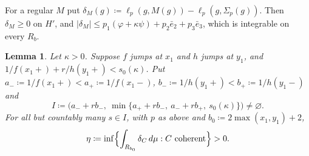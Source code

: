 \documentclass[11pt]{article}
\newtheorem{lemma}[theorem]{Lemma}
\theoremstyle{definition}\newtheorem{definition}[theorem]{Definition}
\theoremstyle{remark}\newtheorem{remark}[theorem]{Remark}
\begin{document}
For a regular $M$ put $\delta_M(g)\coloneqq\ell_p(g,M(g))-\ell_p(g,\Sigma_p(g))$.
Then $\delta_M\ge0$ on $H'$, and $|\delta_M|\le p_1(\varphi+\kappa\psi)+p_2\bar e_2
+p_3\bar e_3$, which is integrable on every $R_b$.

\begin{lemma}\label{lem:corner}
Let $\kappa>0$. Suppose $f$ jumps at $x_1$ and $h$ jumps at $y_1$, and
$1/f(x_1+)+r/h(y_1+)<s_0(\kappa)$. Put $a_-\coloneqq1/f(x_1+)<a_+\coloneqq
1/f(x_1-)$, $b_-\coloneqq1/h(y_1+)<b_+\coloneqq1/h(y_1-)$ and
\[
 I\coloneqq\bigl(a_-+rb_-,\ \min\{a_++rb_-,\ a_-+rb_+,\ s_0(\kappa)\}\bigr)
 \ne\varnothing .
\]
For all but countably many $s\in I$, with $p$ as above and
$b_0\coloneqq2\max(x_1,y_1)+2$,
\[
 \eta\coloneqq\inf\Bigl\{\int_{R_{b_0}}\delta_C\,d\mu:C\text{ coherent}\Bigr\}>0 .
\]
\end{lemma}
\end{document}
